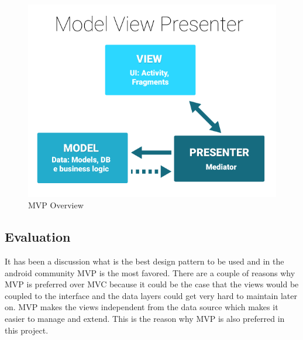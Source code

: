         \begin{figure}[htbp!]
            \centering \includegraphics[scale=0.5]{grafiken/mvp.jpg}
            \caption{MVP Overview \cite{TinMegali2016}} 
            \label{fig:mvpOverview}
        \end{figure}

    \subsection{Evaluation}
        It has been a discussion what is the best design pattern to be used and in the 
        android community MVP is the most favored. There are a couple of reasons why 
        MVP is preferred over MVC because it could be the case that the views would be
        coupled to the interface and the data layers could get very hard to maintain
        later on. MVP makes the views independent from the data source which makes it
        easier to manage and extend. This is the reason why MVP is also preferred in
        this project.


